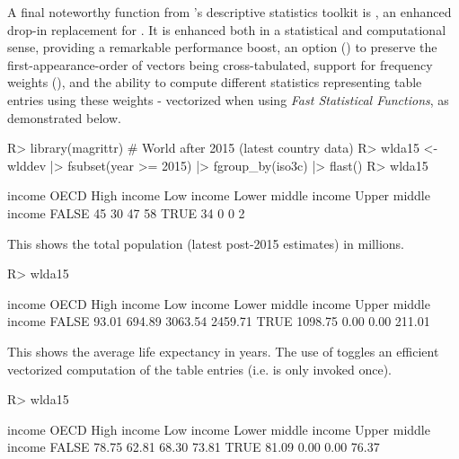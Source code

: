\documentclass[article]{jss}
\newcommand{\fct}[1]{\code{#1()}}
\begin{document}
A final noteworthy function from 's descriptive statistics toolkit is \fct{qtab}, an enhanced drop-in replacement for . It is enhanced both in a statistical and computational sense, providing a remarkable performance boost, an option () to preserve the first-appearance-order of vectors being cross-tabulated, support for frequency weights (), and the ability to compute different statistics representing table entries using these weights - vectorized when using \emph{Fast Statistical Functions}, as demonstrated below.
%
\begin{Schunk}
\begin{Sinput}
R> library(magrittr) # World after 2015 (latest country data)
R> wlda15 <- wlddev |> fsubset(year >= 2015) |> fgroup_by(iso3c) |> flast()
R> wlda15 %$% qtab(OECD, income)
\end{Sinput}
\begin{Soutput}
       income
OECD    High income Low income Lower middle income Upper middle income
  FALSE          45         30                  47                  58
  TRUE           34          0                   0                   2
\end{Soutput}
\end{Schunk}
This shows the total population (latest post-2015 estimates) in millions.
\begin{Schunk}
\begin{Sinput}
R> wlda15 %$% qtab(OECD, income, w = POP) %>% divide_by(1e6)
\end{Sinput}
\begin{Soutput}
       income
OECD    High income Low income Lower middle income Upper middle income
  FALSE       93.01     694.89             3063.54             2459.71
  TRUE      1098.75       0.00                0.00              211.01
\end{Soutput}
\end{Schunk}
This shows the average life expectancy in years. The use of \fct{fmean} toggles an efficient vectorized computation of the table entries (i.e. \fct{fmean} is only invoked once).
\begin{Schunk}
\begin{Sinput}
R> wlda15 %$% qtab(OECD, income, w = LIFEEX, wFUN = fmean) %>% replace_na(0)
\end{Sinput}
\begin{Soutput}
       income
OECD    High income Low income Lower middle income Upper middle income
  FALSE       78.75      62.81               68.30               73.81
  TRUE        81.09       0.00                0.00               76.37
\end{Soutput}
\end{Schunk}
\end{document}
